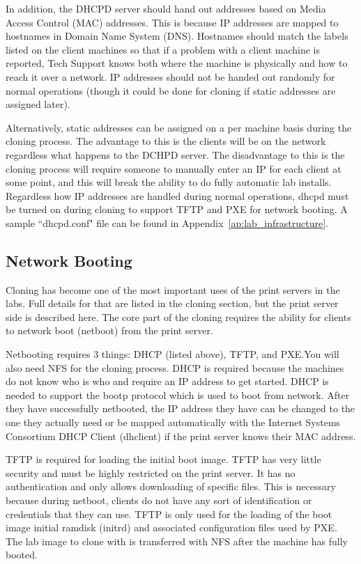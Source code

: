 In addition, the DHCPD server should hand out addresses based on Media Access Control (MAC) addresses.  This is because IP addresses are mapped to hostnames in Domain Name System (DNS).  Hostnames should match the labels listed on the client machines so that if a problem with a client machine is reported, Tech Support knows both where the machine is physically and how to reach it over a network.  IP addresses should not be handed out randomly for normal operations (though it could be done for cloning if static addresses are assigned later).  

Alternatively, static addresses can be assigned on a per machine basis during the cloning process.  The advantage to this is the clients will be on the network regardless what happens to the DCHPD server.  The disadvantage to this is the cloning process will require someone to manually enter an IP for each client at some point, and this will break the ability to do fully automatic lab installs.   Regardless how IP addresses are handled during normal operations, dhcpd must be turned on during cloning to support TFTP and PXE for network booting.  A sample ``dhcpd.conf" file can be found in Appendix~\ref{ap:lab_infrastructure}.

\subsection{Network Booting}
Cloning has become one of the most important uses of the print servers in the labs.  Full details for that are listed in the cloning section, but the print server side is described here.  The core part of the cloning requires the ability for clients to network boot (netboot) from the print server.  

Netbooting requires 3 things:  DHCP (listed above), TFTP, and PXE.You will also need NFS for the cloning process.  DHCP is required because the machines do not know who is who and require an IP address to get started.  DHCP is needed to support the bootp protocol which is used to boot from network.  After they have successfully netbooted, the IP address they have can be changed to the one they actually need or be mapped automatically with the Internet Systems Consortium DHCP Client (dhclient) if the print server knows their MAC address.  

TFTP is required for loading the initial boot image.  TFTP has very little security and must be highly restricted on the print server.  It has no authentication and only allows downloading of specific files.  This is necessary because during netboot, clients do not have any sort of identification or credentials that they can use.  TFTP is only used for the loading of the boot image initial ramdisk (initrd) and associated configuration files used by PXE.  The lab image to clone with is transferred with NFS after the machine has fully booted.  

